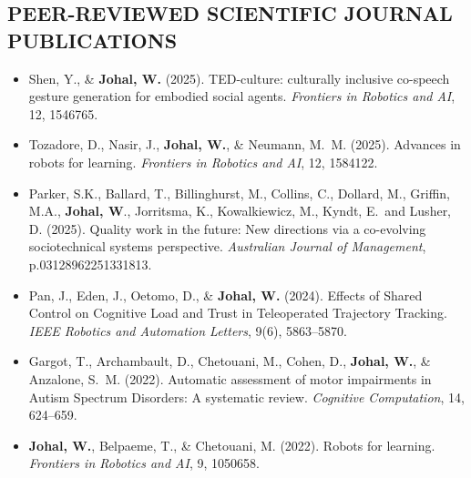 %

\subsection{PEER-REVIEWED SCIENTIFIC JOURNAL PUBLICATIONS}
\vspace{2pt}

\begin{itemize}[nosep]
    \renewcommand\labelitemi{$\bullet$}

    \item Shen, Y., \& \textbf{Johal, W.} (2025). TED-culture: culturally inclusive co-speech gesture generation for embodied social agents. \textit{Frontiers in Robotics and AI}, 12, 1546765.

    \item Tozadore, D., Nasir, J., \textbf{Johal, W.}, \& Neumann, M.\ M. (2025). Advances in robots for learning. \textit{Frontiers in Robotics and AI}, 12, 1584122.

    \item Parker, S.K., Ballard, T., Billinghurst, M., Collins, C., Dollard, M., Griffin, M.A., \textbf{Johal, W}., Jorritsma, K., Kowalkiewicz, M., Kyndt, E.\ and Lusher, D. (2025). Quality work in the future: New directions via a co-evolving sociotechnical systems perspective. \textit{Australian Journal of Management}, p.03128962251331813.

    \item Pan, J., Eden, J., Oetomo, D., \& \textbf{Johal, W.} (2024). Effects of Shared Control on Cognitive Load and Trust in Teleoperated Trajectory Tracking. \textit{IEEE Robotics and Automation Letters}, 9(6), 5863--5870.

    \item Gargot, T., Archambault, D., Chetouani, M., Cohen, D., \textbf{Johal, W.}, \& Anzalone, S.\ M. (2022). Automatic assessment of motor impairments in Autism Spectrum Disorders: A systematic review. \textit{Cognitive Computation}, 14, 624--659.

    \item \textbf{Johal, W.}, Belpaeme, T., \& Chetouani, M. (2022). Robots for learning. \textit{Frontiers in Robotics and AI}, 9, 1050658.


\end{itemize}
